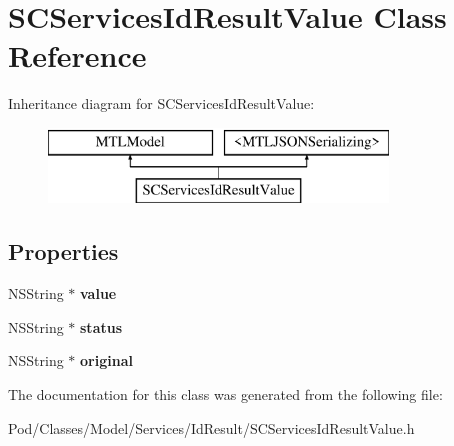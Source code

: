 \hypertarget{interface_s_c_services_id_result_value}{}\section{S\+C\+Services\+Id\+Result\+Value Class Reference}
\label{interface_s_c_services_id_result_value}
Inheritance diagram for S\+C\+Services\+Id\+Result\+Value\+:\begin{figure}[H]
\begin{center}
\leavevmode
\includegraphics[height=2.000000cm]{interface_s_c_services_id_result_value}
\end{center}
\end{figure}
\subsection*{Properties}
\begin{DoxyCompactItemize}
\item 
N\+S\+String $\ast$ {\bfseries value}\hypertarget{interface_s_c_services_id_result_value_a1ffdb7788a1c46aa4cea726929be464e}{}\label{interface_s_c_services_id_result_value_a1ffdb7788a1c46aa4cea726929be464e}

\item 
N\+S\+String $\ast$ {\bfseries status}\hypertarget{interface_s_c_services_id_result_value_aabd0eb50b833abca6757ec8bc321a187}{}\label{interface_s_c_services_id_result_value_aabd0eb50b833abca6757ec8bc321a187}

\item 
N\+S\+String $\ast$ {\bfseries original}\hypertarget{interface_s_c_services_id_result_value_ac4d3f43556e16cb5fbf3323d6a2650d3}{}\label{interface_s_c_services_id_result_value_ac4d3f43556e16cb5fbf3323d6a2650d3}

\end{DoxyCompactItemize}


The documentation for this class was generated from the following file\+:\begin{DoxyCompactItemize}
\item 
Pod/\+Classes/\+Model/\+Services/\+Id\+Result/S\+C\+Services\+Id\+Result\+Value.\+h\end{DoxyCompactItemize}
